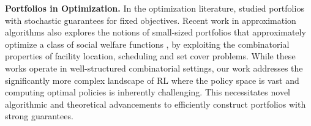 \textbf{Portfolios in Optimization.}
In the optimization literature, \cite{drygala2024data} studied portfolios with stochastic guarantees for fixed objectives. Recent work in approximation algorithms also explores the notions of small-sized portfolios that approximately optimize a class of social welfare functions \cite{gupta2024a, gupta2024b, goel2006simultaneous, golovin2008all,chakrabarty2019approximation}, by exploiting the combinatorial properties of facility location, scheduling and set cover problems. While these works operate in well-structured combinatorial settings, our work addresses the significantly more complex landscape of RL where the policy space is vast and computing optimal policies is inherently challenging. This necessitates novel algorithmic and theoretical advancements to efficiently construct portfolios with strong guarantees.